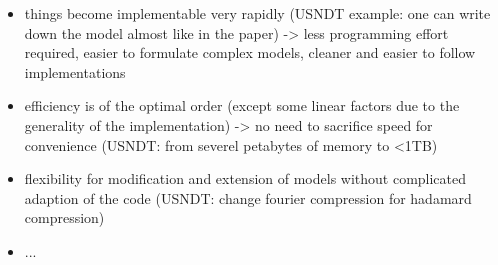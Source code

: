 
%
%
%
%
%

\begin{itemize}
  \item things become implementable very rapidly (USNDT example: one can write down the model almost like in the paper) -> less programming effort required, easier to formulate complex models, cleaner and easier to follow implementations
  \item efficiency is of the optimal order (except some linear factors due to the generality of the implementation) -> no need to sacrifice speed for convenience (USNDT: from severel petabytes of memory to <1TB)
  \item flexibility for modification and extension of models without complicated adaption of the code (USNDT: change fourier compression for hadamard compression)
  \item ...
\end{itemize}
